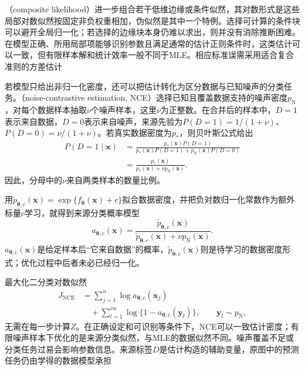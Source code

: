 （composite likelihood）进一步组合若干低维边缘或条件似然，其对数形式是这些局部对数似然按固定非负权重相加，伪似然是其中一个特例。选择可计算的条件块可以避开全局归一化；若选择的边缘块本身仍难以求出，则并没有消除推断困难。在模型正确、所用局部项能够识别参数且满足通常的估计正则条件时，这类估计可以一致，但有限样本解和统计效率一般不同于MLE。相应标准误需采用适合复合准则的方差估计

若模型只给出非归一化密度，还可以把估计转化为区分数据与已知噪声的分类任务。（noise-contrastive estimation, NCE）选择已知且覆盖数据支持的噪声密度$p_{\mathrm{N}}$，对每个数据样本抽取$\nu$个噪声样本，这里$\nu$为正整数。在合并后的样本中，$D=1$表示来自数据，$D=0$表示来自噪声，来源先验为$P(D=1)=1/(1+\nu)$、$P(D=0)=\nu/(1+\nu)$。若真实数据密度为$p_*$，则贝叶斯公式给出
\[
  \begin{aligned}
    P(D=1\mid\bm{x})
      &=\frac{p_*(\bm{x})P(D=1)}
        {p_*(\bm{x})P(D=1)+p_{\mathrm{N}}(\bm{x})P(D=0)}\\
      &=\frac{p_*(\bm{x})}
        {p_*(\bm{x})+\nu p_{\mathrm{N}}(\bm{x})}.
  \end{aligned}
\]
因此，分母中的$\nu$来自两类样本的数量比例。

用$\widetilde p_{\bm{\theta},c}(\bm{x})=\exp\{f_{\bm{\theta}}(\bm{x})+c\}$拟合数据密度，并把负对数归一化常数作为额外标量$c$学习，就得到来源分类概率模型
\[
  a_{\bm{\theta},c}(\bm{x})
  =\frac{\widetilde p_{\bm{\theta},c}(\bm{x})}
         {\widetilde p_{\bm{\theta},c}(\bm{x})
                +\nu p_{\mathrm{N}}(\bm{x})}.
\]
$a_{\bm{\theta},c}(\bm{x})$是给定样本后“它来自数据”的概率，$\widetilde p_{\bm{\theta},c}(\bm{x})$则是待学习的数据密度形式；优化过程中后者未必已经归一化。

最大化二分类对数似然
\[
  \begin{aligned}
    J_{\mathrm{NCE}}
      &=\sum_{j=1}^n\log a_{\bm{\theta},c}(\bm{x}_j)\\
      &\quad+\sum_{l=1}^{\nu n}
        \log\{1-a_{\bm{\theta},c}(\bm{y}_l)\},
        \qquad \bm{y}_l\sim p_{\mathrm{N}},
  \end{aligned}
\]
无需在每一步计算$Z$。在正确设定和可识别等条件下，NCE可以一致估计密度；有限噪声样本下优化的是来源分类似然，与MLE的数据似然不同。噪声覆盖不足或分类任务过易会影响参数信息。来源标签$D$是估计构造的辅助变量，原图中的预测任务仍由学得的数据模型承担

